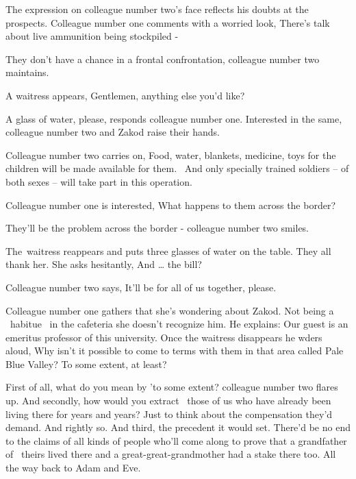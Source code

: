 \documentclass[letterpaper]{article}
\begin{document}
The expression on colleague number two's face reflects his doubts at the prospects. Colleague number one comments with a
worried look, {\textquotedbl}There's talk about live ammunition being stockpiled -{\textquotedbl}~ 

{\textquotedbl}They don't have a chance in a frontal confrontation,{\textquotedbl} colleague number two maintains.

A waitress appears, {\textquotedbl}Gentlemen, anything else you'd like?{\textquotedbl} 

{\textquotedbl}A glass of water, please,{\textquotedbl} responds colleague number one. Interested in the same, colleague
number two and Zakod raise their hands. 

Colleague number two carries on, {\textquotedbl}Food, water, blankets, medicine, toys for the children will be made
available for them. ~And only specially trained soldiers -- of both sexes -- will take part in this
operation.{\textquotedbl} 

Colleague number one is interested, {\textquotedbl}What happens to them across the border?{\textquotedbl} 

{\textquotedbl}They'll be the problem across the border -{\textquotedbl} colleague number two smiles.

The~waitress reappears and puts three glasses of water on the table. They all thank her. She asks hesitantly,
{\textquotedbl}And {\dots} the bill?{\textquotedbl} 

Colleague number two says, {\textquotedbl}It'll be for all of us together, please.{\textquotedbl} 

Colleague number one gathers that she's wondering about Zakod. Not being a \ habitue \ in the cafeteria she doesn't
recognize him. He explains: {\textquotedbl}Our guest is an emeritus professor of this university.{\textquotedbl} Once
the waitress disappears he wders aloud, {\textquotedbl}Why isn't it possible to come to terms with them in that area
called Pale Blue Valley? To some extent, at least?{\textquotedbl} 

{\textquotedbl}First of all, what do you mean by 'to some extent?{\textquotedbl} colleague number two flares up.
{\textquotedbl}And secondly, how would you extract \ those of us who have already been living there for years and
years? Just to think about the compensation they'd demand. And rightly so. And third, the precedent it would set.
There'd be no end to the claims of all kinds of people who'll come along to prove that a grandfather of \ theirs lived
there and a great-great-grandmother had a stake there too. All the way back to Adam and Eve.{\textquotedbl} 
\end{document}
